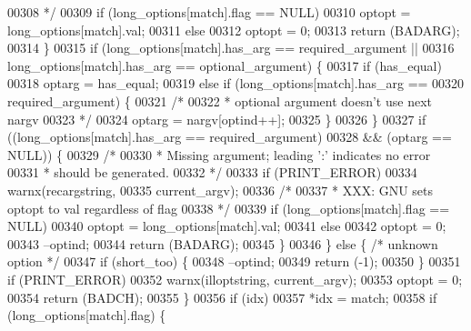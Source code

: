 \begin{DoxyCode}
{{{{{{{00308 \textcolor{comment}{             */}
00309             \textcolor{keywordflow}{if} (long\_options[match].flag == NULL)
00310                 optopt = long\_options[match].val;
00311             \textcolor{keywordflow}{else}
00312                 optopt = 0;
00313             \textcolor{keywordflow}{return} (BADARG);
00314         \}
00315         \textcolor{keywordflow}{if} (long\_options[match].has_arg == required_argument ||
00316             long\_options[match].has_arg == optional_argument) \{
00317             \textcolor{keywordflow}{if} (has\_equal)
00318                 optarg = has\_equal;
00319             \textcolor{keywordflow}{else} \textcolor{keywordflow}{if} (long\_options[match].has_arg ==
00320                 required_argument) \{
00321                 \textcolor{comment}{/*}
00322 \textcolor{comment}{                 * optional argument doesn't use next nargv}
00323 \textcolor{comment}{                 */}
00324                 optarg = nargv[optind++];
00325             \}
00326         \}
00327         \textcolor{keywordflow}{if} ((long\_options[match].has_arg == required_argument)
00328             && (optarg == NULL)) \{
00329             \textcolor{comment}{/*}
00330 \textcolor{comment}{             * Missing argument; leading ':' indicates no error}
00331 \textcolor{comment}{             * should be generated.}
00332 \textcolor{comment}{             */}
00333             \textcolor{keywordflow}{if} (PRINT_ERROR)
00334                 warnx(recargstring,
00335                     current\_argv);
00336             \textcolor{comment}{/*}
00337 \textcolor{comment}{             * XXX: GNU sets optopt to val regardless of flag}
00338 \textcolor{comment}{             */}
00339             \textcolor{keywordflow}{if} (long\_options[match].flag == NULL)
00340                 optopt = long\_options[match].val;
00341             \textcolor{keywordflow}{else}
00342                 optopt = 0;
00343             --optind;
00344             \textcolor{keywordflow}{return} (BADARG);
00345         \}
00346     \} \textcolor{keywordflow}{else} \{            \textcolor{comment}{/* unknown option */}
00347         \textcolor{keywordflow}{if} (short\_too) \{
00348             --optind;
00349             \textcolor{keywordflow}{return} (-1);
00350         \}
00351         \textcolor{keywordflow}{if} (PRINT_ERROR)
00352             warnx(illoptstring, current\_argv);
00353         optopt = 0;
00354         \textcolor{keywordflow}{return} (BADCH);
00355     \}
00356     \textcolor{keywordflow}{if} (idx)
00357         *idx = match;
00358     \textcolor{keywordflow}{if} (long\_options[match].flag) \{
}}}}}}}
\end{DoxyCode}
